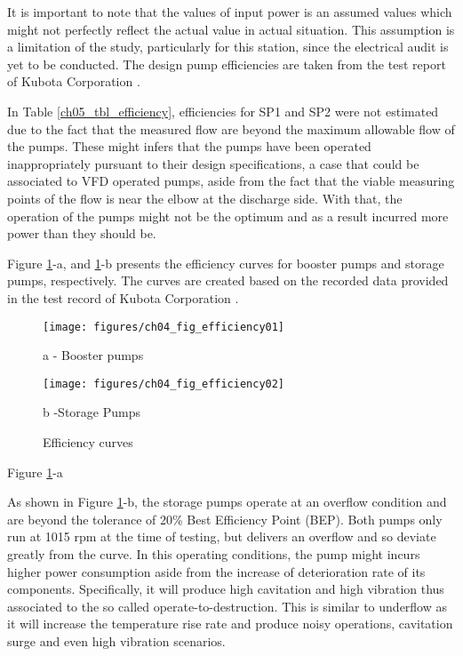 It is important to note that the values of input power is an assumed values which might not perfectly reflect the actual value in actual situation. This assumption is a limitation of the study, particularly for this station, since the electrical audit is yet to be conducted. The design pump efficiencies are taken from the test report of Kubota Corporation \cite{Kubota2010}. 

In Table \ref{ch05_tbl_efficiency}, efficiencies for SP1 and SP2 were not estimated due to the fact that the measured flow are beyond the maximum allowable flow of the pumps. These might infers that the pumps have been operated inappropriately pursuant to their design specifications, a case that could be associated to VFD operated pumps, aside from the fact that the viable measuring points of the flow is near the elbow at the discharge side. With that, the operation of the pumps might not be the optimum and as a result incurred more power than they should be. 

Figure \ref{ch04_efficiencycurves}-a, and \ref{ch04_efficiencycurves}-b presents the efficiency curves for booster pumps and storage pumps, respectively. The curves are created based on the recorded data provided in the test record of Kubota Corporation \cite{Kubota2010}. 


\begin{figure}[!htb]
	\begin{minipage}[b]{0.5\linewidth}
		\centering
		\texttt{[image: figures/ch04\_fig\_efficiency01]}
		\caption*{a - Booster pumps}%
	\end{minipage}
	\hspace{0.05cm}
	\begin{minipage}[b]{0.5\linewidth}
		\centering
		\texttt{[image: figures/ch04\_fig\_efficiency02]}
		\caption*{b -Storage Pumps} %
	\end{minipage}
		\caption{Efficiency curves}
		\label{ch04_efficiencycurves}
\end{figure}

Figure \ref{ch04_efficiencycurves}-a 

As shown in Figure \ref{ch04_efficiencycurves}-b, the storage pumps operate at an overflow condition and are beyond the tolerance of 20\% Best Efficiency Point (BEP). Both pumps only run at 1015 rpm at the time of testing, but delivers an overflow and so deviate greatly from the curve. In this operating conditions, the pump might incurs higher power consumption aside from the increase of deterioration rate of its components. Specifically, it will produce high cavitation and high vibration thus associated to the so called operate-to-destruction. This is similar to underflow as it will increase the temperature rise rate and produce noisy operations, cavitation surge and even high vibration scenarios.  

